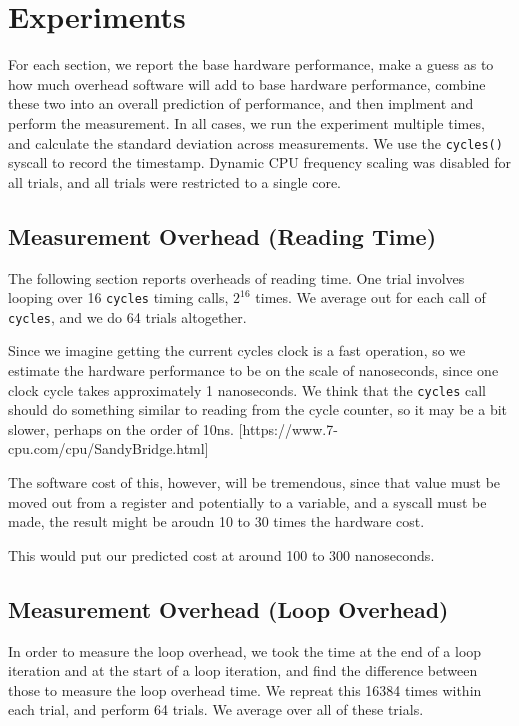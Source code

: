 \documentclass[letterpaper,twocolumn,10pt]{article}
\begin{document}
\section{Experiments}

For each section, we report the base hardware performance, make a guess as to how much overhead software will add to base hardware performance, combine these two into an overall prediction of performance, and then implment and perform the measurement. In all cases, we run the experiment multiple times, and calculate the standard deviation across measurements. We use the \texttt{cycles()} syscall to record the timestamp. Dynamic CPU frequency scaling was disabled for all trials, and all trials were restricted to a single core.

\subsection{Measurement Overhead (Reading Time)}

The following section reports overheads of reading time. One trial involves looping over 16 \texttt{cycles} timing calls, $2^{16}$ times. We average out for each call of \texttt{cycles}, and we do 64 trials altogether.

Since we imagine getting the current cycles clock is a fast operation, so we estimate the hardware performance to be on the scale of nanoseconds, since one clock cycle takes approximately 1 nanoseconds. We think that the \texttt{cycles} call should do something similar to reading from the cycle counter, so it may be a bit slower, perhaps on the order of 10ns.
[https://www.7-cpu.com/cpu/SandyBridge.html]

The software cost of this, however, will be tremendous, since that value must be moved out from a register and potentially to a variable, and a syscall must be made, the result might be aroudn 10 to 30 times the hardware cost.

This would put our predicted cost at around 100 to 300 nanoseconds.

\subsection{Measurement Overhead (Loop Overhead)}

In order to measure the loop overhead, we took the time at the end of a loop
iteration and at the start of a loop iteration, and find the difference between
those to measure the loop overhead time. We repreat this 16384 times within
each trial, and perform 64 trials. We average over all of these trials.
\end{document}
